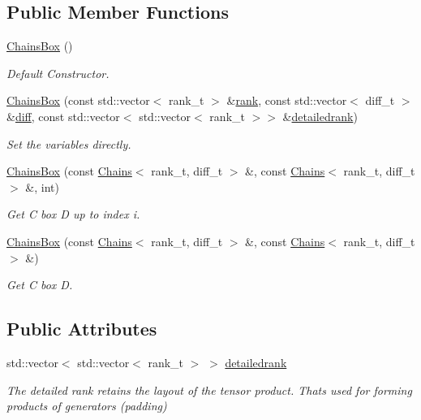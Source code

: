 \subsection*{Public Member Functions}
\begin{DoxyCompactItemize}
\item 
\hyperlink{classMackey_1_1ChainsBox_aa5b4853612f378261b6d321da748f576}{Chains\+Box} ()
\begin{DoxyCompactList}\small\item\em Default Constructor. \end{DoxyCompactList}\item 
\hyperlink{classMackey_1_1ChainsBox_a30bb1f7fa7ca1e655c9d8b3501f98369}{Chains\+Box} (const std\+::vector$<$ rank\+\_\+t $>$ \&\hyperlink{classMackey_1_1Chains_ad041dff6f210ae5be4de0a3b076a4d95}{rank}, const std\+::vector$<$ diff\+\_\+t $>$ \&\hyperlink{classMackey_1_1Chains_a9ccee2cbb3daa1e82bab920aeef59516}{diff}, const std\+::vector$<$ std\+::vector$<$ rank\+\_\+t $>$$>$ \&\hyperlink{classMackey_1_1ChainsBox_a565be64db2cd9c573edd4866dbd8d1d6}{detailedrank})
\begin{DoxyCompactList}\small\item\em Set the variables directly. \end{DoxyCompactList}\item 
\hyperlink{classMackey_1_1ChainsBox_a5ad9aaa3181850b3e297e698ea8eb39f}{Chains\+Box} (const \hyperlink{classMackey_1_1Chains}{Chains}$<$ rank\+\_\+t, diff\+\_\+t $>$ \&, const \hyperlink{classMackey_1_1Chains}{Chains}$<$ rank\+\_\+t, diff\+\_\+t $>$ \&, int)
\begin{DoxyCompactList}\small\item\em Get C box D up to index i. \end{DoxyCompactList}\item 
\hyperlink{classMackey_1_1ChainsBox_a6e001d0c3284bc1abf6d101bc76ad109}{Chains\+Box} (const \hyperlink{classMackey_1_1Chains}{Chains}$<$ rank\+\_\+t, diff\+\_\+t $>$ \&, const \hyperlink{classMackey_1_1Chains}{Chains}$<$ rank\+\_\+t, diff\+\_\+t $>$ \&)
\begin{DoxyCompactList}\small\item\em Get C box D. \end{DoxyCompactList}\end{DoxyCompactItemize}
\subsection*{Public Attributes}
\begin{DoxyCompactItemize}
\item 
std\+::vector$<$ std\+::vector$<$ rank\+\_\+t $>$ $>$ \hyperlink{classMackey_1_1ChainsBox_a565be64db2cd9c573edd4866dbd8d1d6}{detailedrank}
\begin{DoxyCompactList}\small\item\em The detailed rank retains the layout of the tensor product. That\textquotesingle{}s used for forming products of generators (padding) \end{DoxyCompactList}\end{DoxyCompactItemize}


